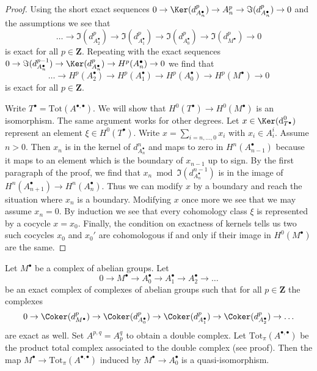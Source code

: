 \begin{proof}
Using the short exact sequences
$0 \to \Ker(d^p_{A_n^\bullet}) \to A_n^p \to \Im(d^p_{A_n^\bullet}) \to 0$
and the assumptions we see that
$$
\ldots \to \Im(d_{A_2^\bullet}^p) \to \Im(d_{A_1^\bullet}^p)
\to \Im(d_{A_0^\bullet}^p) \to \Im(d_{M^\bullet}^p) \to 0
$$
is exact for all $p \in \mathbf{Z}$. Repeating with the exact sequences
$0 \to \Im(d^{p - 1}_{A_n^\bullet}) \to \Ker(d^p_{A_n^\bullet})
\to H^p(A_n^\bullet) \to 0$ we find that
$$
\ldots \to H^p(A_2^\bullet) \to H^p(A_1^\bullet)
\to H^p(A_0^\bullet) \to H^p(M^\bullet) \to 0
$$
is exact for all $p \in \mathbf{Z}$.

\medskip\noindent
Write $T^\bullet = \text{Tot}(A^{\bullet, \bullet})$. We will show that
$H^0(T^\bullet) \to H^0(M^\bullet)$ is an isomorphism. The same argument
works for other degrees. Let $x \in \Ker(\text{d}_{T^\bullet}^0)$ represent
an element $\xi \in H^0(T^\bullet)$.
Write $x = \sum_{i = n, \ldots, 0} x_i$ with $x_i \in A_i^i$.
Assume $n > 0$. Then $x_n$ is in the kernel of $d_{A_n^\bullet}^n$
and maps to zero in $H^n(A_{n - 1}^\bullet)$ because it maps
to an element which is the boundary of $x_{n - 1}$ up to sign.
By the first paragraph of the proof, we find that
$x_n \bmod \Im(d^{n - 1}_{A_n^\bullet})$
is in the image of $H^n(A_{n + 1}^\bullet) \to H^n(A_n^\bullet)$.
Thus we can modify $x$ by a boundary and reach the situation
where $x_n$ is a boundary. Modifying $x$ once more we see that
we may assume $x_n = 0$. By induction we see that every cohomology
class $\xi$ is represented by a cocycle $x = x_0$.
Finally, the condition on exactness of kernels tells us
two such cocycles $x_0$ and $x_0'$ are cohomologous if
and only if their image in $H^0(M^\bullet)$ are the same.
\end{proof}

\begin{lemma}
\label{lemma-good-right-resolution-gives-qis}
Let $M^\bullet$ be a complex of abelian groups. Let
$$
0 \to M^\bullet \to A_0^\bullet \to A_1^\bullet \to A_2^\bullet \to \ldots
$$
be an exact complex of complexes of abelian groups
such that for all $p \in \mathbf{Z}$ the complexes
$$
0 \to
\Coker(d_{M^\bullet}^p) \to
\Coker(d_{A_0^\bullet}^p) \to
\Coker(d_{A_1^\bullet}^p) \to
\Coker(d_{A_2^\bullet}^p) \to \ldots
$$
are exact as well. Set $A^{p, q} = A_p^q$ to obtain a double
complex. Let $\text{Tot}_\pi(A^{\bullet, \bullet})$ be the
product total complex associated to the double complex
(see proof). Then the map
$M^\bullet \to \text{Tot}_\pi(A^{\bullet, \bullet})$
induced by $M^\bullet \to A_0^\bullet$ is a quasi-isomorphism.
\end{lemma}

